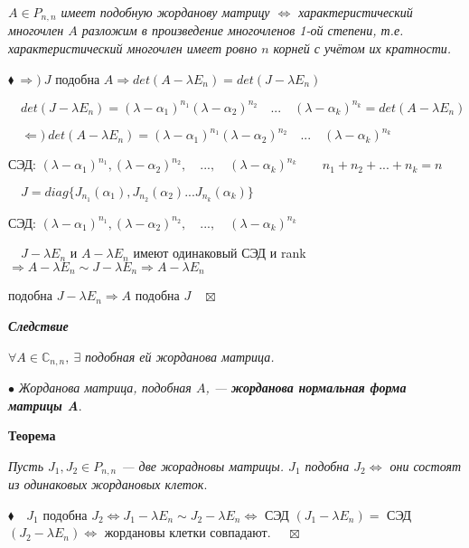 \documentclass[a4paper, 12pt]{report}
\begin{document}
	\textit{$A \in P_{n,n}$ имеет подобную жорданову матрицу $\Longleftrightarrow$ характеристический многочлен $A$ разложим в произведение многочленов 1-ой степени, т.е. характеристический многочлен имеет ровно $n$ корней с учётом их кратности.}
	\par\bigskip
	$\blacklozenge\ \Rightarrow)\ J$ подобна $A \Rightarrow det(A- \lambda E_n) = det(J - \lambda E_n)$
	\par\bigskip
	$\quad det(J - \lambda E_n) = (\lambda - \alpha_1)^{n_1} (\lambda - \alpha_2)^{n_2} \quad ... \quad (\lambda - \alpha_k)^{n_k} = det(A - \lambda E_n)$
	\par\bigskip
	$\quad \Leftarrow)\ det(A - \lambda E_n) = (\lambda - \alpha_1)^{n_1} (\lambda - \alpha_2)^{n_2} \quad ... \quad (\lambda - \alpha_k)^{n_k}$
	\par\bigskip
	\quad СЭД: $(\lambda - \alpha_1)^{n_1}, (\lambda - \alpha_2)^{n_2}, \quad ..., \quad (\lambda - \alpha_k)^{n_k} \quad \quad n_1 + n_2 + ... + n_k = n$
	\par\bigskip
	$\quad J = diag\{J_{n_1}(\alpha_1), J_{n_2}(\alpha_2) ... J_{n_k}(\alpha_k)\}$
	\par\bigskip
	\quad СЭД: $(\lambda - \alpha_1)^{n_1}, (\lambda - \alpha_2)^{n_2}, \quad ..., \quad (\lambda - \alpha_k)^{n_k}$
	\par\bigskip
	$\quad J - \lambda E_n$ и $A - \lambda E_n$ имеют одинаковый СЭД и rank $\Rightarrow A - \lambda E_n \sim J - \lambda E_n \Rightarrow A - \lambda E_n$ 
	
	\quad подобна $J - \lambda E_n \Rightarrow A$ подобна $J \quad \boxtimes$
	\par\bigskip
	\textit{\textbf{Следствие}}
	
	$\forall A \in \mathbb{C}_{n,n},\ \exists$ \textit{подобная ей жорданова матрица. }
	\par\bigskip
	$\bullet$ \textit{Жорданова матрица, подобная $A$, --- \textbf{жорданова нормальная форма матрицы A}}.
	\par\bigskip
	\textbf{Теорема}
	
	\textit{Пусть $J_1, J_2 \in P_{n,n}$ --- две жорадновы матрицы.
		$J_1$ подобна $J_2 \Longleftrightarrow$ они состоят из одинаковых жордановых клеток}.
	\par\bigskip
	$\blacklozenge \quad J_1$ подобна $J_2 \Longleftrightarrow J_1 - \lambda E_n \sim J_2 - \lambda E_n \Longleftrightarrow$ СЭД $(J_1 - \lambda E_n) =$ СЭД $(J_2 - \lambda E_n) \Longleftrightarrow$ жордановы клетки совпадают. $\quad \boxtimes$
	\par\bigskip
	
\end{document}

